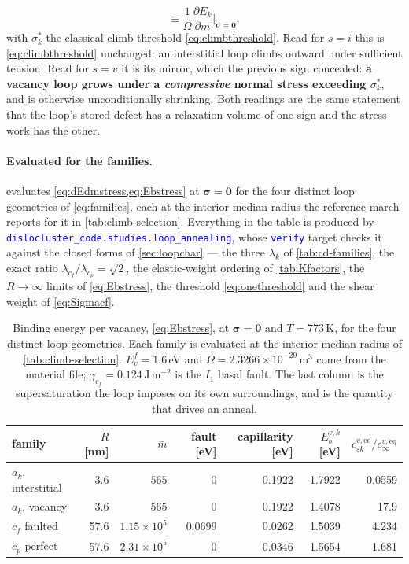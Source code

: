 \documentclass{article}
\newcommand{\textttclr}[1]{\textcolor{blue}{\texttt{#1}}}
\begin{document}
\begin{enumerate}
\begin{equation}
        \equiv\frac{1}{\Omega}\frac{\partial E_k}{\partial m}
              \bigg|_{\bm\sigma=\bm0},
        \label{eq:onethreshold}
      \end{equation}
      with $\sigma^\ast_k$ the classical climb threshold \cref{eq:climbthreshold}.
      Read for $s=i$ this is \cref{eq:climbthreshold} unchanged: an interstitial
      loop climbs outward under sufficient tension. Read for $s=v$ it is its
      mirror, which the previous sign concealed: \textbf{a vacancy loop grows
      under a \emph{compressive} normal stress exceeding $\sigma^\ast_k$}, and is
      otherwise unconditionally shrinking. Both readings are the same statement
      that the loop's stored defect has a relaxation volume of one sign and the
      stress work has the other.
\end{enumerate}

\paragraph{Evaluated for the families.}  evaluates
\cref{eq:dEdmstress,eq:Ebstress} at $\bm\sigma=\bm0$ for the four distinct loop
geometries of \cref{eq:families}, each at the interior median radius the
reference march reports for it in \cref{tab:climb-selection}. Everything in the
table is produced by \textttclr{dislocluster\_code.studies.loop\_annealing}, whose
\textttclr{verify} target checks it against the closed forms of
\cref{sec:loopchar} --- the three $\lambda_k$ of \cref{tab:cd-families}, the exact
ratio $\lambda_{c_f}/\lambda_{c_p}=\sqrt2$, the elastic-weight ordering of
\cref{tab:Kfactors}, the $R\to\infty$ limits of \cref{eq:Ebstress}, the threshold
\cref{eq:onethreshold} and the shear weight of \cref{eq:Sigmacf}.

\begin{table}[htbp]
\centering
\caption{Binding energy per vacancy, \cref{eq:Ebstress}, at $\bm\sigma=\bm0$ and
$T=773\,$K, for the four distinct loop geometries. Each family is evaluated at
the interior median radius of \cref{tab:climb-selection}. $E^f_v=1.6\,$eV and
$\Omega=2.3266\times10^{-29}\,$m$^3$ come from the material file;
$\gamma_{c_f}=0.124\,$J\,m$^{-2}$ is the $I_1$ basal fault. The last column is
the supersaturation the loop imposes on its own surroundings, and is the quantity
that drives an anneal.}
\label{tab:anneal-binding}
\begin{tabular}{@{}l r r r r r r@{}}
\toprule
family & $R$ [nm] & $\bar m$ & fault [eV] & capillarity [eV]
 & $E^{v,k}_b$ [eV] & $c^{v,\mathrm{eq}}_{sk}/c^{v,\mathrm{eq}}_\infty$\\
\midrule
$a_k$, interstitial & 3.6  & $565$              & 0      & 0.1922 & 1.7922 & 0.0559\\
$a_k$, vacancy      & 3.6  & $565$              & 0      & 0.1922 & 1.4078 & 17.9\\
$c_f$ faulted       & 57.6 & $1.15\times10^{5}$ & 0.0699 & 0.0262 & 1.5039 & 4.234\\
$c_p$ perfect       & 57.6 & $2.31\times10^{5}$ & 0      & 0.0346 & 1.5654 & 1.681\\
\bottomrule
\end{tabular}
\end{table}
\end{document}
